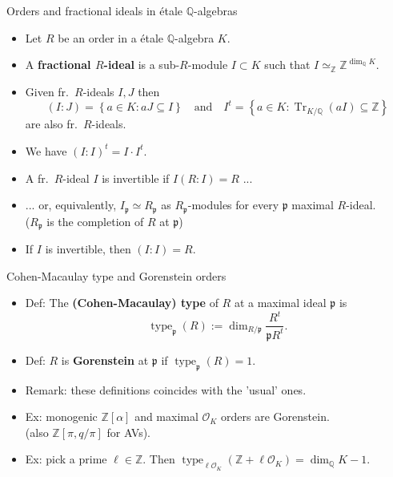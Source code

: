 \documentclass[usenames,dvipsnames,handout]{beamer}
\def\Q{\mathbb{Q}}
\def\Z{\mathbb{Z}}
\DeclareMathOperator{\Tr}{Tr}
\DeclareMathOperator{\type}{type}
\newcommand{\cO}{{\mathcal O}}
\newcommand{\p}{{\mathfrak p}}
\newcommand{\set}[1]{\left\lbrace#1\right\rbrace }
\begin{document}
\begin{frame}{ Orders and fractional ideals in \'etale $\Q$-algebras } 
    \begin{itemize}
    \item \pause Let $R$ be an order in a \'etale $\Q$-algebra $K$.
    \item \pause A {\bf fractional $R$-ideal} is a sub-$R$-module $I\subset K$ such that $I\simeq_\Z\Z^{\dim_\Q K}$.
    \item \pause Given fr.~$R$-ideals $I,J$ then 
    $$(I:J)=\set{a \in K : aJ\subseteq I}
    \quad \text{and}\quad I^t=\set{a \in K : \Tr_{K/\Q}(a I)\subseteq \Z}$$
    are also fr.~$R$-ideals.
    \item \pause We have $(I:I)^t = I\cdot I^t$.
    \item \pause A fr.~$R$-ideal $I$ is invertible if $I(R:I)=R$ ...
    \item \pause ... or, equivalently, $I_\p \simeq R_\p$ as $R_\p$-modules for every $\p$ maximal $R$-ideal.\\
        ($R_\p$ is the completion of $R$ at $\p$)
    \item \pause If $I$ is invertible, then $(I:I)=R$.
	\end{itemize}
\end{frame}

\begin{frame}{ Cohen-Macaulay type and Gorenstein orders } 
    \begin{itemize}
    \item Def: The {\bf (Cohen-Macaulay) type} of $R$ at a maximal ideal $\p$ is
        \[ \type_\p (R) := \dim_{R/\p} \frac{R^t}{\p R^t}. \]
    \item \pause Def: $R$ is {\bf Gorenstein} at $\p$ if $\type_\p(R)=1$.
    \item \pause Remark: these definitions coincides with the 'usual' ones.
    \item \pause Ex: monogenic $\Z[\alpha]$ and maximal $\cO_K$ orders are Gorenstein.\\
    (also $\Z[\pi,q/\pi]$ for AVs).
    \item \pause Ex: pick a prime $\ell\in\Z$. Then $\type_{\ell\cO_K}(\Z+\ell\cO_K) = \dim_\Q K-1$.
	\end{itemize}
\end{frame}
\end{document}
